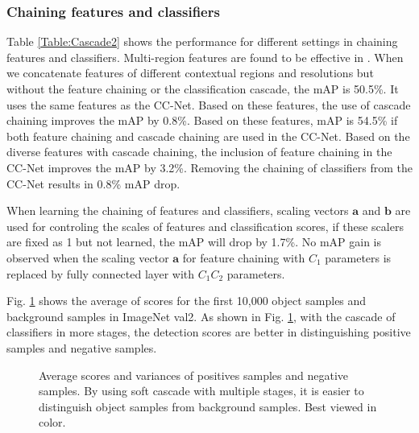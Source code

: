 \documentclass[10pt,twocolumn,letterpaper]{article}
\begin{document}


\subsubsection{Chaining features and classifiers}
Table \ref{Table:Cascade2} shows the performance for different settings in chaining features and classifiers.
Multi-region features are found to  be effective in \cite{gidaris2015object}. When we concatenate features of different contextual regions and resolutions but without the feature chaining or the classification cascade,  the mAP is 50.5\%. It uses the same features as the CC-Net. Based on these features, the use of cascade chaining improves the mAP by 0.8\%. Based on these features, mAP is 54.5\% if both feature chaining and cascade chaining are used in the CC-Net.  Based on the diverse features with cascade chaining, the inclusion of feature chaining in the CC-Net improves the mAP by 3.2\%. Removing the chaining of classifiers from the CC-Net results in 0.8\% mAP drop.



When learning the chaining of features and classifiers, scaling vectors $\mathbf{a}$ and $\mathbf{b}$ are used for controling the scales of features and classification scores, if these scalers are fixed as 1 but not learned, the mAP will drop by 1.7\%. No mAP gain is observed when the scaling vector $\mathbf{a}$ for feature chaining with $C_1$ parameters is replaced by fully connected layer with $C_1 C_2$ parameters.


Fig. \ref{fig:Cascade_scores} shows the average of scores for the first 10,000 object samples and background samples in ImageNet val2. As shown in Fig. \ref{fig:Cascade_scores}, with the cascade of classifiers in more stages, the detection scores are better in distinguishing positive samples and negative samples. 

\begin{figure}
\begin{center}
 \centerline{}
\end{center}
\vspace{-10pt}
   \caption{Average scores and variances of positives samples and negative samples. By using soft cascade with multiple stages, it is easier to distinguish object samples from background samples.  Best viewed in color.}
\label{fig:Cascade_scores}
\end{figure}
\end{document}
